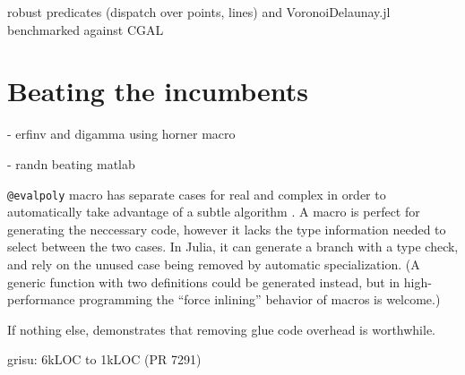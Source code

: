robust predicates (dispatch over points, lines) and VoronoiDelaunay.jl
benchmarked against CGAL


\section{Beating the incumbents}

- erfinv and digamma using horner macro

- randn beating matlab

\texttt{@evalpoly} macro has separate cases for real and complex in order to
automatically take advantage of a subtle algorithm \cite{knuth1969art}.
A macro is perfect for generating the neccessary code, however it lacks
the type information needed to select between the two cases.
In Julia, it can generate a branch with a type check, and rely on the
unused case being removed by automatic specialization. (A generic
function with two definitions could be generated instead, but in
high-performance programming the ``force inlining'' behavior of macros
is welcome.)

If nothing else, demonstrates that removing glue code overhead is worthwhile.

grisu: 6kLOC to 1kLOC (PR 7291)




